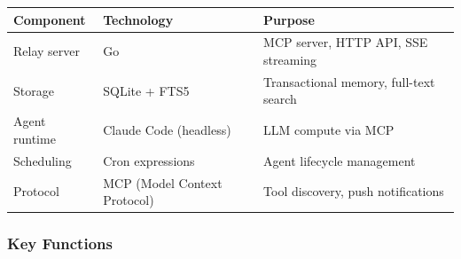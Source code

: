 \documentclass[11pt]{article}
\begin{document}
\begin{longtable}[]{@{}
  >{\raggedright\arraybackslash}p{}
  >{\raggedright\arraybackslash}p{}
  >{\raggedright\arraybackslash}p{}@{}}
\toprule\noalign{}
\begin{minipage}[b]{\linewidth}\raggedright
Component
\end{minipage} & \begin{minipage}[b]{\linewidth}\raggedright
Technology
\end{minipage} & \begin{minipage}[b]{\linewidth}\raggedright
Purpose
\end{minipage} \\
\midrule\noalign{}
\endhead
\bottomrule\noalign{}
\endlastfoot
Relay server & Go & MCP server, HTTP API, SSE streaming \\
Storage & SQLite + FTS5 & Transactional memory, full-text search \\
Agent runtime & Claude Code (headless) & LLM compute via MCP \\
Scheduling & Cron expressions & Agent lifecycle management \\
Protocol & MCP (Model Context Protocol) & Tool discovery, push
notifications \\
\end{longtable}

\subsubsection{Key Functions}\label{key-functions}
\end{document}
